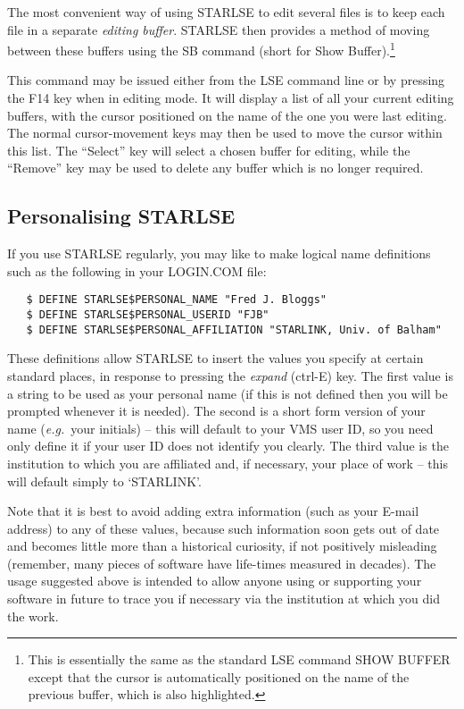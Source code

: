 The most convenient way of using STARLSE to edit several files is to keep each
file in a separate {\em editing buffer}. STARLSE then provides a method of
moving between these buffers using the SB command (short for Show
Buffer).\footnote{This is essentially the same as the standard LSE command SHOW
BUFFER except that the cursor is automatically positioned on the name of the
previous buffer, which is also highlighted.}

This command may be issued either from the LSE command line or by pressing the
F14 key when in editing mode. It will display a list of all your current
editing buffers, with the cursor positioned on the name of the one you were
last editing. The normal cursor-movement keys may then be used to move the
cursor within this list. The ``Select'' key will select a chosen buffer for
editing, while the ``Remove'' key may be used to delete any buffer which is no
longer required.

\subsection{Personalising STARLSE}

If you use \mbox{STARLSE} regularly, you may like to make logical name
definitions such as the following in your \mbox{LOGIN.COM} file: 

\begin{verbatim}
   $ DEFINE STARLSE$PERSONAL_NAME "Fred J. Bloggs"
   $ DEFINE STARLSE$PERSONAL_USERID "FJB"
   $ DEFINE STARLSE$PERSONAL_AFFILIATION "STARLINK, Univ. of Balham"
\end{verbatim}

These definitions allow \mbox{STARLSE} to insert the values you specify at
certain standard places, in response to pressing the {\em expand} (ctrl-E)
key. 
The first value is a string to be used as your personal name (if this is not
defined then you will be prompted whenever it is needed). 
The second is a short form version of your name ({\em e.g.}\ your initials)
-- this will default to your \mbox{VMS} user ID, so you need only define it
if your user ID does not identify you clearly. 
The third value is the institution to which you are affiliated and, if
necessary, your place of work -- this will default simply to `STARLINK'. 

Note that it is best to avoid adding extra information (such as your E-mail
address) to any of these values, because such information soon gets out of
date and becomes little more than a historical curiosity, if not positively
misleading (remember, many pieces of software have life-times measured in
decades). 
The usage suggested above is intended to allow anyone using or supporting
your software in future to trace you if necessary via the institution at
which you did the work. 

